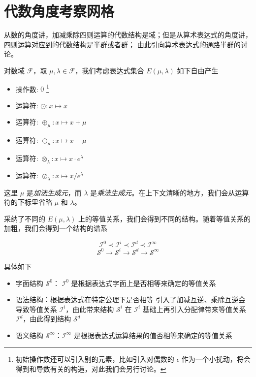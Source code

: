 \documentclass[a4paper,12pt]{article}
\numberwithin{definition}{section}
\numberwithin{lemma}{section}
\numberwithin{proposition}{section}
\numberwithin{theorem}{section}
\numberwithin{grammar}{section}
\numberwithin{program}{section}
\numberwithin{convention}{section}
\numberwithin{corollary}{section}
\begin{document}
\newpage

\section{代数角度考察网格}

从数的角度讲，加减乘除四则运算的代数结构是域；但是从算术表达式的角度讲，四则运算对应到的代数结构是半群或者群；
由此引向算术表达式的通路半群的讨论。

对数域 $\mathcal{F}$，取 $\mu, \lambda \in \mathcal{F}$，我们考虑表达式集合 $E(\mu, \lambda)$ 如下自由产生
\begin{itemize}
    \item 操作数: $0$ \footnote[1]{初始操作数还可以引入别的元素，比如引入对偶数的 $\epsilon$ 作为一个小扰动，将会得到和导数有关的构造，对此我们会另行讨论。}
    \item 运算符: $\odot: x \mapsto x$
    \item 运算符: $\oplus_\mu: x \mapsto x + \mu$
    \item 运算符: $\ominus_\mu: x \mapsto x - \mu$
    \item 运算符: $\otimes_\lambda: x \mapsto x \cdot e^\lambda$
    \item 运算符: $\oslash_\lambda: x \mapsto x / e^\lambda$
\end{itemize}

这里 $\mu$ 是\emph{加法生成元}，而 $\lambda$ 是\emph{乘法生成元}。在上下文清晰的地方，我们会从运算符的下标里省略 $\mu$ 和 $\lambda$。

采纳了不同的 $E(\mu, \lambda)$ 上的等值关系，我们会得到不同的结构。随着等值关系的加粗，我们会得到一个结构的谱系

$$
  \mathcal{I}^0 \prec \mathcal{I}^i \prec \mathcal{I}^d \prec \mathcal{I}^\infty
$$
$$
  \mathcal{S}^0 \to \mathcal{S}^i \to \mathcal{S}^d \to \mathcal{S}^\infty
$$

具体如下

\begin{itemize}
    \item 字面结构 $\mathcal{S}^0$： $\mathcal{I}^0$ 是根据表达式字面上是否相等来确定的等值关系
    \item 语法结构：根据表达式在特定公理下是否相等
        \subitem 引入了加减互逆、乘除互逆会导致等值关系 $\mathcal{I}^i$，由此带来结构 $\mathcal{S}^i$
        \subitem 在 $\mathcal{I}^i$ 基础上再引入分配律带来等值关系 $\mathcal{I}^d$，由此得到结构 $\mathcal{S}^d$
    \item 语义结构 $\mathcal{S}^\infty$：$\mathcal{I}^\infty$ 是根据表达式运算结果的值否相等来确定的等值关系
\end{itemize}
\end{document}
